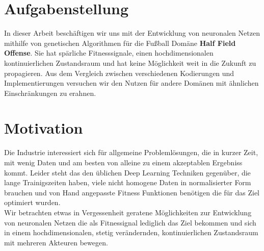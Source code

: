 \section{Aufgabenstellung}

In dieser Arbeit beschäftigen wir uns mit der Entwicklung von neuronalen Netzen mithilfe von genetischen Algorithmen für die Fußball Domäne \textbf{Half Field Offense}\cite{hfo}. Sie hat spärliche Fitnesssignale, einen hochdimensionalen kontinuierlichen Zustandsraum und hat keine Möglichkeit weit in die Zukunft zu propagieren. Aus dem Vergleich zwischen verschiedenen Kodierungen und Implementierungen versuchen wir den Nutzen für andere Domänen mit ähnlichen Einschränkungen zu erahnen.


\section{Motivation}
Die Industrie interessiert sich für allgemeine Problemlösungen, die in kurzer Zeit, mit wenig Daten und am besten von alleine zu einem akzeptablen Ergebniss kommt. Leider steht das den üblichen Deep Learning Techniken gegenüber, die lange Trainigszeiten haben, viele nicht homogene Daten in normalisierter Form brauchen und von Hand angepasste Fitness Funktionen benötigen die für das Ziel optimiert wurden. \\[2mm] Wir betrachten etwas in Vergessenheit geratene Möglichkeiten zur Entwicklung von neuronalen Netzen die als Fitnessignal lediglich das Ziel bekommen und sich in einem hochdimensionalen, stetig verändernden, kontinuierlichen Zustandsraum mit mehreren Akteuren bewegen.


